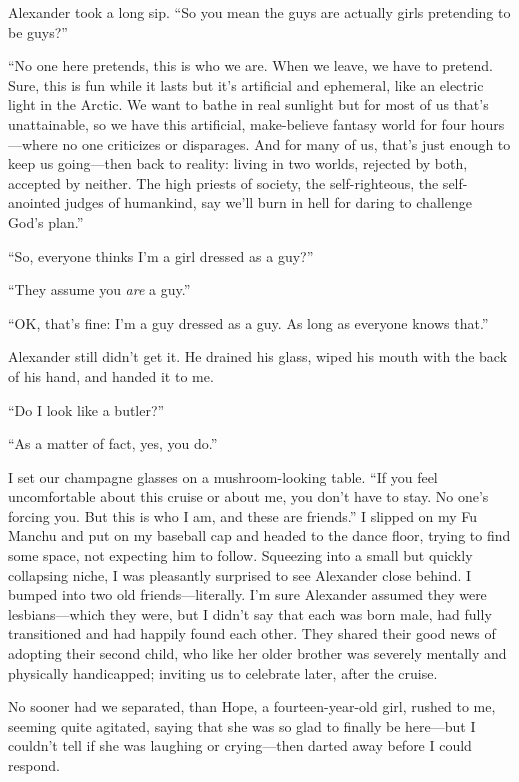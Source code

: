 Alexander took a long sip. ``So you mean the guys are actually girls
pretending to be guys?''

``No one here pretends, this is who we are. When we leave, we have to
pretend. Sure, this is fun while it lasts but it's artificial and
ephemeral, like an electric light in the Arctic. We want to bathe in
real sunlight but for most of us that's unattainable, so we have this
artificial, make-believe fantasy world for four hours---where no one
criticizes or disparages. And for many of us, that's just enough to keep
us going---then back to reality: living in two worlds, rejected by both,
accepted by neither. The high priests of society, the self-righteous,
the self-anointed judges of humankind, say we'll burn in hell for daring
to challenge God's plan.''

``So, everyone thinks I'm a girl dressed as a guy?''

``They assume you \emph{are} a guy.''

``OK, that's fine: I'm a guy dressed as a guy. As long as everyone knows
that.''

Alexander still didn't get it. He drained his glass, wiped his mouth
with the back of his hand, and handed it to me.

``Do I look like a butler?''

``As a matter of fact, yes, you do.''

I set our champagne glasses on a mushroom-looking table. ``If you feel
uncomfortable about this cruise or about me, you don't have to stay. No
one's forcing you. But this is who I am, and these are friends.'' I
slipped on my Fu Manchu and put on my baseball cap and headed to the
dance floor, trying to find some space, not expecting him to follow.
Squeezing into a small but quickly collapsing niche, I was pleasantly
surprised to see Alexander close behind. I bumped into two old
friends---literally. I'm sure Alexander assumed they were
lesbians---which they were, but I didn't say that each was born male,
had fully transitioned and had happily found each other. They shared
their good news of adopting their second child, who like her older
brother was severely mentally and physically handicapped; inviting us to
celebrate later, after the cruise.

No sooner had we separated, than Hope, a fourteen-year-old girl, rushed
to me, seeming quite agitated, saying that she was so glad to finally be
here---but I couldn't tell if she was laughing or crying---then darted
away before I could respond.

